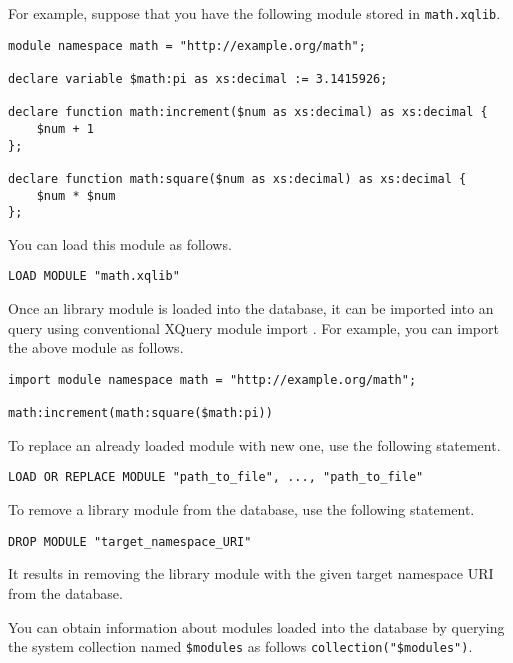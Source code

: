 \documentclass[a4paper,12pt]{article}
\begin{document}
For example, suppose that you have the following module stored in
\verb!math.xqlib!.

\begin{verbatim}
module namespace math = "http://example.org/math";

declare variable $math:pi as xs:decimal := 3.1415926;

declare function math:increment($num as xs:decimal) as xs:decimal {
    $num + 1
};

declare function math:square($num as xs:decimal) as xs:decimal {
    $num * $num
};
\end{verbatim}

You can load this module as follows.

\begin{verbatim}
LOAD MODULE "math.xqlib"
\end{verbatim}

Once an library module is loaded into the database, it can be imported into an
query using conventional XQuery module import \cite{paper:query-language}. For
example, you can import the above module as follows.

\begin{verbatim}
import module namespace math = "http://example.org/math";

math:increment(math:square($math:pi))

\end{verbatim}


To replace an already loaded module with new one, use the following statement.

\begin{verbatim}
LOAD OR REPLACE MODULE "path_to_file", ..., "path_to_file"
\end{verbatim}

To remove a library module from the database, use the following statement.

\begin{verbatim}
DROP MODULE "target_namespace_URI"
\end{verbatim}

It results in removing the library module with the given target namespace URI
from the database.

You can obtain information about modules loaded into the database by querying
the system collection named \verb!$modules! as follows
\verb!collection("$modules")!.


\end{document}
